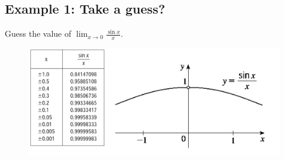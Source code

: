 \documentclass[10pt]{book}
\theoremstyle{definition}
\begin{document}
\subsection*{Example 1: Take a guess?}
Guess the value of $\displaystyle \lim_{x\rightarrow 0}\frac{\sin x}{x}$.
\begin{figure}[h!]
    \centering
    \includegraphics[scale=0.5]{fig2.png}
\end{figure}
\clearpage
\end{document}
